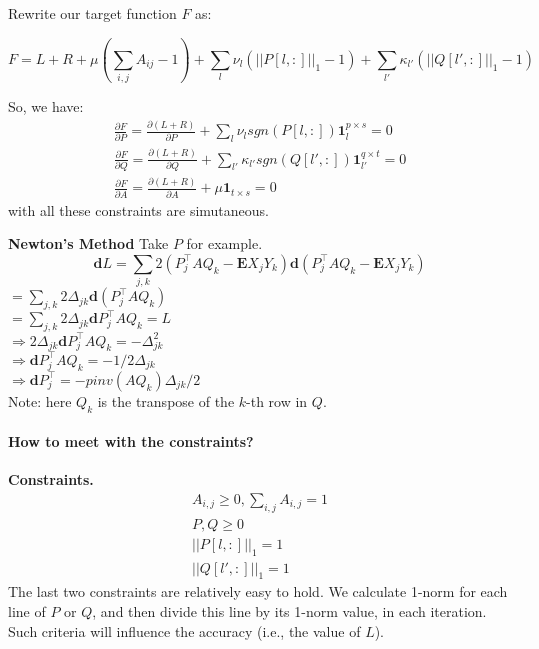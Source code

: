 \documentclass[12pt]{article}
\begin{document}
Rewrite our target function $F$ as:

\begin{equation}
F = L + R + \mu (\sum_{i,j} A_{ij} - 1) + \sum_l {\nu_l (||P[l, :]||_1 - 1)} + \sum_{l'}{\kappa_{l'} (||Q[l', :]||_1 - 1)}
\end{equation}

So, we have:
\begin{eqnarray}
\frac{\partial F}{\partial P} = \frac{\partial (L + R)}{\partial P} + \sum_l{\nu_l sgn(P[l, :]) \textbf{1}^{p \times s}_l} = 0 \\
\frac{\partial F}{\partial Q} = \frac{\partial (L + R)}{\partial Q} + \sum_{l'}{\kappa_{l'} sgn(Q[l', :]) \textbf{1}^{q \times t}_{l'}} = 0 \\
\frac{\partial F}{\partial A} = \frac{\partial (L + R)}{\partial A} + \mu \textbf{1}_{t \times s} = 0
\end{eqnarray}
with all these constraints are simutaneous.

\textbf{Newton's Method} Take $P$ for example.
\begin{equation}
\nonumber
\textbf{d}L = \sum_{j,k}{2(P^\top_j A Q_k - \textbf{E}X_j Y_k) \textbf{d}(P^\top_j A Q_k - \textbf{E}X_j Y_k)}
\end{equation}
$ = \sum_{j,k} 2 \Delta_{jk} \textbf{d}(P^\top_j A Q_k)$ \\
$ = \sum_{j,k} 2 \Delta_{jk} \textbf{d}P^\top_j A Q_k = L$ \\
$ \Rightarrow 2\Delta_{jk} \textbf{d}P^\top_j A Q_k = -\Delta_{jk}^2 $ \\
$ \Rightarrow \textbf{d}P^\top_j A Q_k = -1/2\Delta_{jk} $ \\
$ \Rightarrow \textbf{d}P^\top_j = -pinv(A Q_k) \Delta_{jk}/2 $ 
\\
Note: here $Q_k$ is the transpose of the $k$-th row in $Q$.

\paragraph{How to meet with the constraints?}
\textbf{Constraints.} 
\begin{eqnarray}
A_{i,j} \ge 0, \sum_{i,j}A_{i,j}=1 \\
P, Q \ge 0 \\
||P[l,:]||_1 = 1 \\
||Q[l',:]||_1=1
\end{eqnarray}
The last two constraints are relatively easy to hold. We calculate 1-norm for each line of $P$ or $Q$, and then divide this line by its 1-norm value, in each iteration. Such criteria will influence the accuracy (i.e., the value of $L$).
\end{document}
